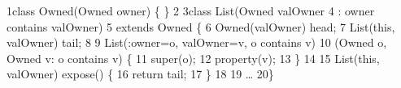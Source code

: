 \begin{tightcode}
\quad\num{1}class Owned(Owned owner) \{ \}
\quad\num{2}
\quad\num{3}class List(Owned valOwner
\quad\num{4}         : owner contains valOwner)
\quad\num{5}    extends Owned \{
\quad\num{6}  Owned(valOwner) head;
\quad\num{7}  List(this, valOwner) tail;
\quad\num{8}
\quad\num{9}  List(:owner=o, valOwner=v, o contains v)
\quad\num{10}      (Owned o, Owned v: o contains v) \{
\quad\num{11}    super(o);
\quad\num{12}    property(v);
\quad\num{13}  \}
\quad\num{14}
\quad\num{15}  List(this, valOwner) expose() \{
\quad\num{16}    return tail;
\quad\num{17}  \}
\quad\num{18}
\quad\num{19}  \ldots{}
\quad\num{20}\}
\end{tightcode}

